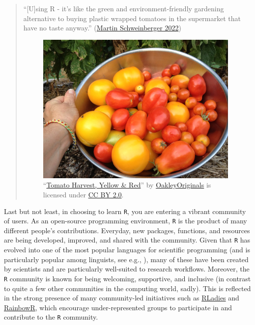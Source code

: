 \documentclass[
  letterpaper,
  DIV=11,
  numbers=noendperiod]{scrreprt}
\begin{document}
\begin{quote}
``{[}U{]}sing R - it's like the green and environment-friendly gardening
alternative to buying plastic wrapped tomatoes in the supermarket that
have no taste anyway.''
(\href{https://slcladal.github.io/whyr.html}{Martin Schweinberger 2022})

\begin{figure}

\includegraphics[width=3.91667in,height=\textheight]{images/TomatoHarvest.jpg}

\caption{\label{fig-tomatoes}``\href{https://www.flickr.com/photos/47264866@N00/9455141053}{Tomato
Harvest, Yellow \& Red}'' by
\href{https://www.flickr.com/photos/47264866@N00}{OakleyOriginals} is
licensed under
\href{https://creativecommons.org/licenses/by/2.0/?ref=openverse}{CC BY
2.0}.}

\end{figure}%
\end{quote}

Last but not least, in choosing to learn \texttt{R}, you are entering a
vibrant community of users. As an open-source programming environment,
\texttt{R} is the product of many different people's contributions.
Everyday, new packages, functions, and resources are being developed,
improved, and shared with the community. Given that \texttt{R} has
evolved into one of the most popular languages for scientific
programming (and is particularly popular among linguists, see e.g., ),
many of these have been created by scientists and are particularly
well-suited to research workflows. Moreover, the \texttt{R} community is
known for being welcoming, supportive, and inclusive (in contrast to
quite a few other communities in the computing world, sadly). This is
reflected in the strong presence of many community-led initiatives such
as \href{https://rladies.org/}{RLadies} and
\href{https://rainbowr.netlify.app/}{RainbowR}, which encourage
under-represented groups to participate in and contribute to the
\texttt{R} community.
\end{document}
